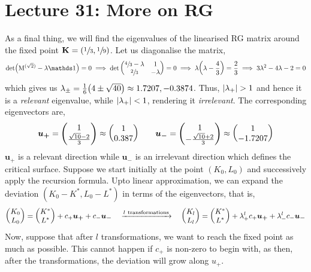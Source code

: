 \section*{Lecture 31: More on RG}
As a final thing, we will find the eigenvalues of the linearised RG matrix around the fixed point $\vb{K} = (\sfrac{1}{3},\sfrac{1}{9})$. Let us diagonalise the matrix, 
\begin{align*}
    \det(\mathrm{M}^{(\sqrt{2})} - \lambda \iden) = 0 \implies \det\mqty( \sfrac{4}{3}-\lambda & 1 \\ \sfrac{2}{3} & -\lambda )=0 \implies \lambda \qty(\lambda - \frac{4}{3}) =\frac{2}{3} \implies 3\lambda^2 - 4 \lambda -2 = 0
\end{align*}
which gives us $\lambda_\pm = \frac{1}{6}\qty(4\pm \sqrt{40}) \approx 1.7207, -0.3874$. Thus, $\abs{\lambda_+}>1$ and hence it is a \textit{relevant} eigenvalue, while $\abs{\lambda_+}<1$, rendering it \textit{irrelevant}. The corresponding eigenvectors are,
\begin{align*}
    \boldsymbol{u_+} =\mqty( 1\\ \frac{\sqrt{10}-2}{3} ) \approx  \mqty( 1\\ 0.387 )  \qquad  \boldsymbol{u_-} = \mqty(   1\\ -\frac{\sqrt{10}+2}{3} )  \approx \mqty( 1\\ -1.7207 ) 
\end{align*}
$\boldsymbol{u_+}$ is a relevant direction while $\boldsymbol{u_-}$ is an irrelevant direction which defines the critical surface.
Suppose we start initially at the point $(K_0,L_0)$ and successively apply the recursion formula. Upto linear approximation, we can expand the deviation $(K_0-K^*,L_0-L^*)$ in terms of the eigenvectors, that is, 
\begin{align}
    \mqty(K_0\\ L_0) = \mqty(K^*\\ L^*) + c_+ \boldsymbol{u_+} +c_-\boldsymbol{u_-} \quad \xrightarrow{l\ \text{transformations}} \quad \mqty(K_l\\ L_l) =\mqty(K^*\\ L^*) + \lambda_+^l c_+ \boldsymbol{u_+} +\lambda_-^l c_-\boldsymbol{u_-}
\end{align}
Now, suppose that after $l$ transformations, we want to reach the fixed point as much as possible. This cannot happen if $c_+$ is non-zero to begin with, as then, after the transformations, the deviation will grow along $u_+$. \\[0.2cm]
